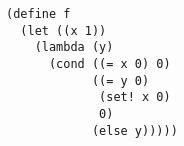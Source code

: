 \documentclass[a4paper,12pt]{article}
\begin{document}
\begin{lstlisting}
(define f
  (let ((x 1))
    (lambda (y)
      (cond ((= x 0) 0)
            ((= y 0)
             (set! x 0)
             0)
            (else y)))))
\end{lstlisting}
\end{document}
